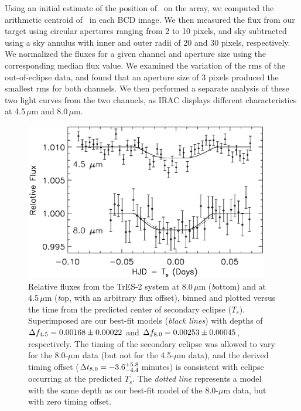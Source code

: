 Using an initial estimate of the position of \tresTwo\ on the array, we computed the arithmetic centroid of \tresTwo\ in each BCD image.
We then measured the flux from our target using circular apertures ranging from 2 to 10 pixels, and sky subtracted using a sky annulus with inner and outer radii of 20 and 30 pixels, respectively.
We normalized the fluxes for a given channel and aperture size using the corresponding median flux value.
We examined the variation of the rms of the out-of-eclipse data, and found that an aperture size of 3 pixels produced the smallest rms for both channels.
We then performed a separate analysis of these two light curves from the two channels, as IRAC displays different characteristics at 4.5\,$\mu$m and 8.0\,$\mu$m.

\begin{figure}
\begin{center}
\includegraphics[width=0.95\textwidth]{6_f1}
\caption[%
Near-infrared relative fluxes from TrES-2 from {\textit Spitzer} observations]{%
Relative fluxes from the TrES-2 system at 8.0\,$\mu$m ({\textit bottom}) and at 4.5\,$\mu$m ({\textit top}, with an arbitrary flux offset), binned and plotted versus the time from the predicted center of secondary eclipse ($T_{s}$).
Superimposed are our best-fit models (\emph{black lines}) with depths of \mbox{$\Delta f_{\rm {4.5}} = 0.00168 \pm 0.00022$} and \mbox{$\Delta f_{\rm {8.0}} = 0.00253 \pm 0.00045$}, respectively.
The timing of the secondary eclipse was allowed to vary for the 8.0-$\mu$m data (but not for the 4.5-$\mu$m data), and the derived timing offset (\mbox{$\Delta t_{\rm {8.0}} = -3.6^{+5.8}_{-4.4}$\,minutes}) is consistent with eclipse occurring at the predicted $T_{s}$.
The \emph{dotted line} represents a model with the same depth as our best-fit model of the 8.0-$\mu$m data, but with zero timing offset.%
}\label{cha:spitzer:fig:tres2_combplot}
\end{center}
\end{figure}

